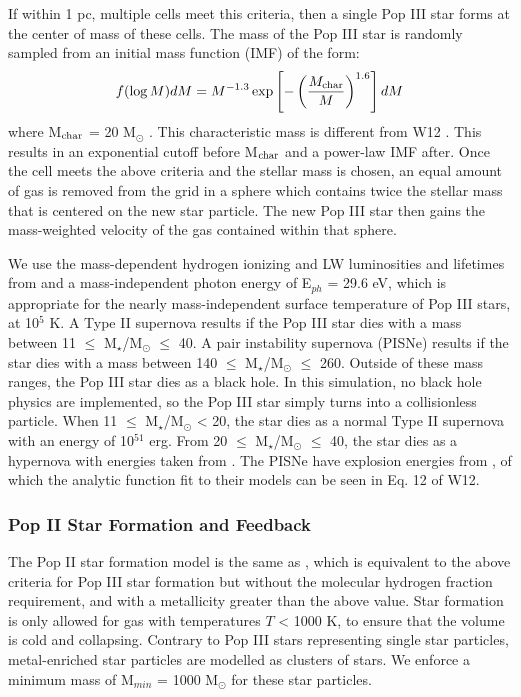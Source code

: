 \documentclass[a4paper,fleqn,usenatbib]{mnras}
\begin{document}
If within 1 pc, multiple cells meet this criteria, then a single Pop III star forms at the center of mass of these cells. The mass of the Pop III star is randomly sampled from an initial mass function (IMF) of the form:
\begin{equation} \label{IMF}
	f(\log M)dM = M^{-1.3} \exp \left[-\left( \frac{M_{\rm char}}{M}\right)^{1.6} \right]dM
\end{equation}
where M$_{\rm char}$ = 20 M$_{\odot}$ \citep{Hirano17}. This characteristic mass is different from W12 \citep{Hirano17}. This results in an exponential cutoff before M$_{\rm char}$ and a power-law IMF after. Once the cell meets the above criteria and the stellar mass is chosen, an equal amount of gas is removed from the grid in a sphere which contains twice the stellar mass that is centered on the new star particle. The new Pop III star then gains the mass-weighted velocity of the gas contained within that sphere.  

We use the mass-dependent hydrogen ionizing and LW luminosities and lifetimes from \citet{Schaerer02} and a mass-independent photon energy of E$_{ph}$ = 29.6 eV, which is appropriate for the nearly mass-independent surface temperature of Pop III stars, at 10$^{5}$ K. A Type II supernova results if the Pop III star dies with a mass between 11 $\leq$ M$_{\star}$/M$_{\odot}$ $\leq$ 40. A pair instability supernova (PISNe) results if the star dies with a mass between 140 $\leq$ M$_{\star}$/M$_{\odot}$ $\leq$ 260. Outside of these mass ranges, the Pop III star dies as a black hole. In this simulation, no black hole physics are implemented, so the Pop III star simply turns into a collisionless particle. When 11 $\leq$ M$_{\star}$/M$_{\odot}$ < 20, the star dies as a normal Type II supernova with an energy of 10$^{51}$ erg. From 20 $\leq$ M$_{\star}$/M$_{\odot}$ $\leq$ 40, the star dies as a hypernova with energies taken from \citet{Nomoto06}. The PISNe have explosion energies from \citet{2002ApJ...567..532H}, of which the analytic function fit to their models can be seen in Eq. 12 of W12. 

\subsubsection{Pop II  Star Formation and Feedback}
The Pop II star formation model is the same as \citet{Wise09}, which is equivalent to the above criteria for Pop III star formation but without the molecular hydrogen fraction requirement, and with a metallicity greater than the above value. Star formation is only allowed for gas with temperatures $T$ < 1000 K, to ensure that the volume is cold and collapsing. Contrary to Pop III stars representing single star particles, metal-enriched star particles are modelled as clusters of stars. We enforce a minimum mass of M$_{min}$ = 1000 M$_{\odot}$ for these star particles. 
\end{document}
